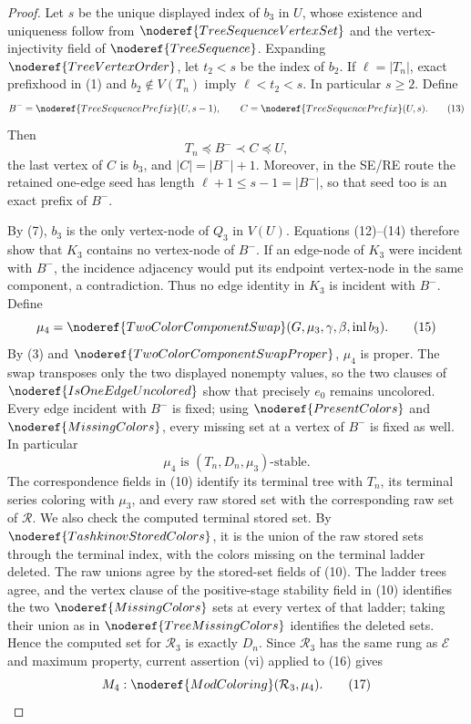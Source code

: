 \begin{proof}
Let \(s\) be the unique displayed index of \(b_3\) in \(U\), whose
existence and uniqueness follow from
\(\noderef{TreeSequenceVertexSet}\) and the vertex-injectivity field of
\(\noderef{TreeSequence}\).  Expanding
\(\noderef{TreeVertexOrder}\), let \(t_2<s\) be the index of \(b_2\).
If \(\ell=|T_n|\), exact prefixhood in (1) and
\(b_2\notin V(T_n)\) imply \(\ell<t_2<s\).  In particular \(s\ge2\).
Define
\[
 B^-=\noderef{TreeSequencePrefix}(U,s-1),\qquad
 C=\noderef{TreeSequencePrefix}(U,s).                         \tag{13}
\]
Then
\[
              T_n\preccurlyeq B^-\prec C\preccurlyeq U,      \tag{14}
\]
the last vertex of \(C\) is \(b_3\), and \(|C|=|B^-|+1\).
Moreover, in the SE/RE route the retained one-edge seed has length
\(\ell+1\le s-1=|B^-|\), so that seed too is an exact prefix of \(B^-\).

By (7), \(b_3\) is the only vertex-node of \(Q_3\) in \(V(U)\).
Equations (12)--(14) therefore show that \(K_3\) contains no vertex-node
of \(B^-\).  If an edge-node of \(K_3\) were incident with \(B^-\),
the incidence adjacency would put its endpoint vertex-node in the same
component, a contradiction.  Thus no edge identity in \(K_3\) is
incident with \(B^-\).  Define
\[
 \mu_4=\noderef{TwoColorComponentSwap}
          (G,\mu_3,\gamma,\beta,\operatorname{inl}b_3).       \tag{15}
\]
By (3) and \(\noderef{TwoColorComponentSwapProper}\), \(\mu_4\) is
proper.  The swap transposes only the two displayed nonempty values, so
the two clauses of \(\noderef{IsOneEdgeUncolored}\) show that precisely
\(e_0\) remains uncolored.  Every edge incident with \(B^-\) is fixed;
using \(\noderef{PresentColors}\) and \(\noderef{MissingColors}\),
every missing set at a vertex of \(B^-\) is fixed as well.  In particular
\[
                  \mu_4\text{ is }(T_n,D_n,\mu_3)\text{-stable}. \tag{16}
\]
The correspondence fields in (10) identify its terminal tree with
\(T_n\), its terminal series coloring with \(\mu_3\), and every raw
stored set with the corresponding raw set of \(\mathcal R\).  We also
check the computed terminal stored set.  By
\(\noderef{TashkinovStoredColors}\), it is the union of the raw stored
sets through the terminal index, with the colors missing on the terminal
ladder deleted.  The raw unions agree by the stored-set fields of (10).
The ladder trees agree, and the vertex clause of the positive-stage
stability field in (10) identifies the two
\(\noderef{MissingColors}\) sets at every vertex of that ladder; taking
their union as in \(\noderef{TreeMissingColors}\) identifies the deleted
sets.  Hence the computed set for \(\mathcal R_3\) is exactly \(D_n\).
Since \(\mathcal R_3\) has the same rung as \(\mathcal E\) and maximum
property, current assertion (vi) applied to (16) gives
\[
                        M_4:\noderef{ModColoring}(\mathcal R_3,\mu_4).
                                                                    \tag{17}
\]


\end{proof}
